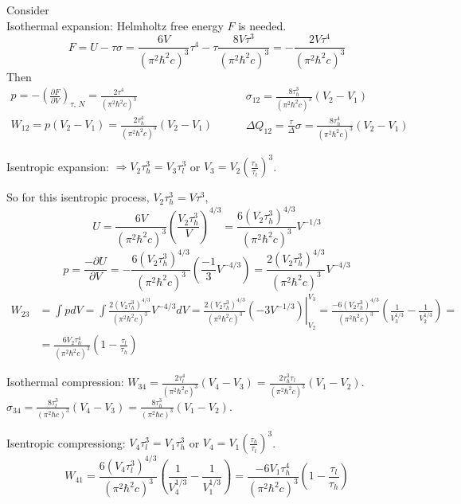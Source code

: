 Consider  \\
Isothermal expansion: Helmholtz free energy $F$ is needed.  
\[
F = U - \tau \sigma = \frac{ 6V}{ (\pi^2 \hbar^2 c)^3 } \tau^4 - \tau \frac{ 8 V \tau^3 }{ (\pi^2 \hbar^2 c)^3 } = -\frac{ 2 V \tau^4 }{ (\pi^2 \hbar^2 c)^3 }
\]
Then 
\[
\begin{gathered}
p  = -\left( \frac{ \partial F}{ \partial V} \right)_{ \tau, \, N} = \frac{2 \tau^4}{ (\pi^2 \hbar^2 c)^3 } \\
W_{12} = p (V_2 - V_1) = \frac{ 2 \tau_h^4 }{ (\pi^2 \hbar^2 c)^3 } (V_2 - V_1)
\end{gathered} \quad \quad \, 
\begin{gathered}
\sigma_{12} = \frac{ 8 \tau_h^3 }{ (\pi^2 \hbar^2 c)^3 }(V_2 - V_1)  \\
\Delta Q_{12} = \frac{ \tau} \Delta \sigma = \frac{ 8 \tau_h^4}{ (\pi^2 \hbar^2 c)^3} (V_2 - V_1)
\end{gathered}
\]

Isentropic expansion: $\Longrightarrow V_2 \tau_h^3 = V_3 \tau_l^3$ or $V_3 = V_2 \left( \frac{ \tau_h}{\tau_l }\right)^3$.  

So for this isentropic process, $V_2 \tau_h^3 = V\tau^3$, 
\[
U = \frac{6V}{ (\pi^2 \hbar^2 c)^3} \left( \frac{V_2 \tau_h^3}{V}\right)^{4/3} = \frac{ 6(V_2 \tau_h^3 )^{4/3} }{ (\pi^2 \hbar^2 c)^3} V^{-1/3}
\]
\[
p = \frac{- \partial U}{ \partial V} = - \frac{ 6 (V_2 \tau_h^3 )^{4/3} }{ (\pi^2 \hbar^2 c)^3} \left( \frac{-1}{3} V^{-4/3} \right) = \frac{ 2 ( V_2 \tau_h^3 )^{4/3} }{ (\pi^2 \hbar^2 c )^3 } V^{-4/3}
\]
\[
\begin{aligned}
W_{23} & = \int p dV = \int \frac{ 2 (V_2 \tau_h^3 )^{4/3}}{ (\pi^2 \hbar^2 c)^3 } V^{-4/3} dV = \left. \frac{ 2 (V_2 \tau_h^3 )^{4/3} }{ (\pi^2 \hbar^2 c)^3}  ( -3V^{-1/3} ) \right|_{V_2}^{V_3} = \frac{ -6 (V_2 \tau_h^3 )^{4/3} }{ (\pi^2 \hbar^2 c)^3 } \left( \frac{1}{V_3^{1/3}} - \frac{1}{ V_2^{1/3} } \right) = \\
& = \frac{ 6 V_2 \tau_h^4}{ (\pi^2 \hbar^2 c)^3} \left( 1 - \frac{\tau_l }{\tau_h} \right)
\end{aligned}
\]

Isothermal compression: $W_{34} = \frac{ 2\tau_l^4}{ (\pi^2 \hbar^2 c)^3 } (V_4 - V_3) = \frac{ 2 \tau_h^3 \tau_l }{ (\pi^2 \hbar^2 c)^3 } (V_1 - V_2)$.  \\  $\sigma_{34} = \frac{8 \tau_l^3}{ (\pi^2 \hbar c)^3} (V_4 - V_3) = \frac{ 8 \tau_h^3 }{(\pi^2 \hbar c)^3} (V_1 -V_2 )$.  

Isentropic compressiong: $V_4 \tau_l^3 = V_1 \tau_h^3$ or $V_4 = V_1 \left( \frac{\tau_h}{\tau_l} \right)^3$.  
\[
W_{41} = \frac{ 6 (V_4 \tau_l^3 )^{4/3} }{ (\pi^2 \hbar^2 c)^3 } \left( \frac{1}{V_4^{1/3}} - \frac{1}{V_1^{1/3}} \right) = \frac{ -6 V_1 \tau_h^4}{ (\pi^2 \hbar^2 c)^3} \left( 1 - \frac{ \tau_l }{\tau_h } \right)
\]

